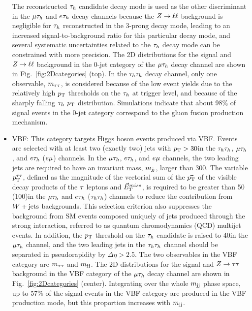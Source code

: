 \begin{itemize}
The reconstructed $\tau_{h}$ candidate decay mode is used as the other discriminant in the $\mu\tau_{h}$ and $e\tau_{h}$ decay channels because the $Z\to\ell\ell$ background is negligible for $\tau_{h}$
reconstructed in the 3-prong decay mode, leading to an increased signal-to-background ratio for this particular decay mode, and several systematic uncertainties related to the $\tau_{h}$ decay mode can be constrained with more precision. The 2D distributions for the signal and $Z\to\ell\ell$ background
in the 0-jet category of the $\mu\tau_{h}$ decay channel are shown in Fig.~\ref{fig:2Dcategories} (top).
In the $\tau_{h}\tau_{h}$ decay channel, only one observable, $m_{\tau\tau}$, is considered because of the low event yields
due to the relatively high $p_\mathrm{T}$ thresholds on the $\tau_{h}$ at trigger level, and because of the sharply falling $\tau_{h}$ $p_\mathrm{T}$ distribution. Simulations indicate that about 98\% of signal events in the 0-jet category correspond to the gluon fusion production mechanism.\\
\item {VBF}: This category targets Higgs boson events produced via VBF.
Events are selected with at least two (exactly two) jets with $p_\mathrm{T}>30$\GeV in the
$\tau_{h}\tau_{h}$, $\mu\tau_{h}$, and $e\tau_{h}$ ($e\mu$) channels.
In the $\mu\tau_{h}$, $e\tau_{h}$, and $e\mu$ channels, the two leading jets are required to have an invariant mass, $m_\mathrm{jj}$, larger than 300\GeV. The variable $p_\mathrm{T}^{\tau\tau}$, defined as the magnitude of the vectorial sum of the $\vec{p_\mathrm{T}}$ of the visible decay products of the $\tau$ leptons and $\vec{E}^{miss}_T$, is required to be greater than 50 (100)\GeV in the $\mu\tau_{h}$
 and $e\tau_{h}$ ($\tau_{h}\tau_{h}$) channels to reduce the contribution from $W+\text{jets}$ backgrounds. This selection criterion also suppresses the background from SM events composed uniquely of jets produced through the strong interaction, referred to as quantum chromodynamics (QCD) multijet events.
In addition, the $p_\mathrm{T}$ threshold on the $\tau_{h}$ candidate is raised to 40\GeV in the $\mu\tau_{h}$ channel, and the
two leading jets in the $\tau_{h}\tau_{h}$ channel should be separated in pseudorapidity by $\Delta\eta>2.5$.
The two observables in the VBF category are $m_{\tau\tau}$ and $m_\mathrm{jj}$. The 2D distributions for the signal and $Z\to\tau\tau$ background
in the VBF category of the $\mu\tau_{h}$ decay channel are shown in Fig.~\ref{fig:2Dcategories} (center). Integrating over the whole $m_\mathrm{jj}$ phase space, up to 57\% of the signal events in the VBF category are produced in the VBF production mode, but this proportion increases with $m_\mathrm{jj}$.\\

\end{itemize}
